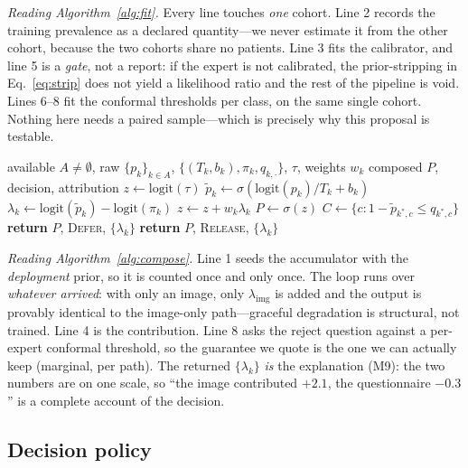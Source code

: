 \documentclass[sigplan,nonacm,screen]{acmart}
\begin{document}
\emph{Reading Algorithm~\ref{alg:fit}.} Every line touches \emph{one} cohort. Line 2 records the training prevalence as a declared quantity---we never estimate it from the other cohort, because the two cohorts share no patients. Line 3 fits the calibrator, and line 5 is a \emph{gate}, not a report: if the expert is not calibrated, the prior-stripping in Eq.~\eqref{eq:strip} does not yield a likelihood ratio and the rest of the pipeline is void. Lines 6--8 fit the conformal thresholds per class, on the same single cohort. Nothing here needs a paired sample---which is precisely why this proposal is testable.

\begin{algorithm}[t]
\caption{CO-PRIOR compose (inference, any subset)}
\label{alg:compose}
\footnotesize
\begin{algorithmic}[1]
\Require available $A\neq\emptyset$, raw $\{p_k\}_{k\in A}$, $\{(T_k,b_k),\pi_k,q_{k,\cdot}\}$, $\tau$, weights $w_k$
\Ensure composed $P$, decision, attribution
\State $z \gets \mathrm{logit}(\tau)$
  \State $\tilde p_k \gets \sigma(\mathrm{logit}(p_k)/T_k + b_k)$ 
  \State $\lambda_k \gets \mathrm{logit}(\tilde p_k) - \mathrm{logit}(\pi_k)$ 
  \State $z \gets z + w_k \lambda_k$ 
\EndFor
\State $P \gets \sigma(z)$
\State $C \gets \{c : 1-\tilde p_{k^\ast,c} \le q_{k^\ast,c}\}$ 
 \State \textbf{return} $P$, \textsc{Defer}, $\{\lambda_k\}$
\EndIf
\State \textbf{return} $P$, \textsc{Release}, $\{\lambda_k\}$
\end{algorithmic}
\end{algorithm}

\emph{Reading Algorithm~\ref{alg:compose}.} Line 1 seeds the accumulator with the \emph{deployment} prior, so it is counted once and only once. The loop runs over \emph{whatever arrived}: with only an image, only $\lambda_{\mathrm{img}}$ is added and the output is provably identical to the image-only path---graceful degradation is structural, not trained. Line 4 is the contribution. Line 8 asks the reject question against a per-expert conformal threshold, so the guarantee we quote is the one we can actually keep (marginal, per path). The returned $\{\lambda_k\}$ \emph{is} the explanation (M9): the two numbers are on one scale, so ``the image contributed $+2.1$, the questionnaire $-0.3$'' is a complete account of the decision.

\subsection{Decision policy}
\end{document}
